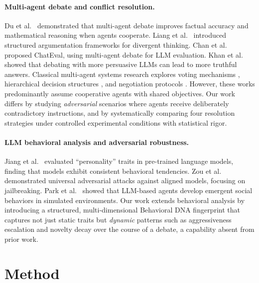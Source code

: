 \documentclass[11pt]{article}
\begin{document}
\paragraph{Multi-agent debate and conflict resolution.}
Du et al.~\cite{du2023improving} demonstrated that multi-agent debate improves factual accuracy and mathematical reasoning when agents cooperate. Liang et al.~\cite{liang2023encouraging} introduced structured argumentation frameworks for divergent thinking. Chan et al.~\cite{chan2023chateval} proposed ChatEval, using multi-agent debate for LLM evaluation. Khan et al.~\cite{khan2024debating} showed that debating with more persuasive LLMs can lead to more truthful answers. Classical multi-agent systems research explores voting mechanisms \cite{arrow1951social}, hierarchical decision structures \cite{tambe1997towards}, and negotiation protocols \cite{jennings2001automated}. However, these works predominantly assume cooperative agents with shared objectives. Our work differs by studying \textit{adversarial} scenarios where agents receive deliberately contradictory instructions, and by systematically comparing four resolution strategies under controlled experimental conditions with statistical rigor.

\paragraph{LLM behavioral analysis and adversarial robustness.}
Jiang et al.~\cite{jiang2024evaluating} evaluated ``personality'' traits in pre-trained language models, finding that models exhibit consistent behavioral tendencies. Zou et al.~\cite{zou2023universal} demonstrated universal adversarial attacks against aligned models, focusing on jailbreaking. Park et al.~\cite{park2023generative} showed that LLM-based agents develop emergent social behaviors in simulated environments. Our work extends behavioral analysis by introducing a structured, multi-dimensional Behavioral DNA fingerprint that captures not just static traits but \textit{dynamic} patterns such as aggressiveness escalation and novelty decay over the course of a debate, a capability absent from prior work.

\section{Method}
\end{document}
